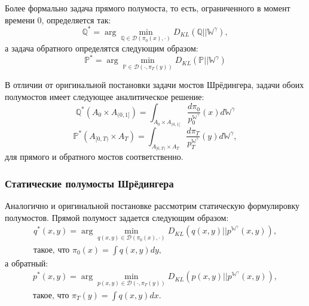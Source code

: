Более формально задача прямого полумоста, то есть, ограниченного в момент времени 0, определяется так:
\begin{equation}
    \mathbb{Q}^*=\arg\min_{\mathbb{Q}\in\mathcal{D}(\pi_0(x), \cdot)}D_{KL}\left(\mathbb{Q}||\mathbb{W}^\gamma\right),
    \label{eq:forward_hsb}
\end{equation}
а задача обратного определятся следующим образом:
\begin{equation}
    \mathbb{P}^*=\arg\min_{\mathbb{P}\in\mathcal{D}(\cdot, \pi_T(y))}D_{KL}\left(\mathbb{P}||\mathbb{W}^\gamma\right)
    \label{eq:backward_hsb}
\end{equation}

В отличии от оригинальной постановки задачи мостов Шрёдингера, задачи обоих полумостов имеет следующее аналитическое решение:
\begin{equation*}
    \mathbb{Q}^*(A_0\times A_{(0,1]})=\int_{A_0\times A_{(0,1]}}\frac{d\pi_0}{p_0^{\mathbb{W}^\gamma}}(x)d\mathbb{W}^\gamma
\end{equation*}
\begin{equation*}
    \mathbb{P}^*(A_{[0,T)} \times A_T)=\int_{A_{[0,T)} \times A_T}\frac{d\pi_T}{p_T^{\mathbb{W}^\gamma}}(y)d\mathbb{W}^\gamma,
\end{equation*}
для прямого и обратного мостов соответственно.

\subsubsection{Статические полумосты Шрёдингера}
Аналогично и оригинальной постановке рассмотрим статическую формулировку полумостов. Прямой полумост задается следующим образом:
\begin{equation}
    \begin{split}
        q^*(x,y)=\arg\min_{q(x,y)\in\mathcal{D}(\pi_0(x), \cdot)}D_{KL}\left(q(x,y)||p^{\mathbb{W}^\gamma}(x,y)\right), \\
        \text{такое, что } \pi_0(x) = \int q(x, y)dy,
    \end{split}
\end{equation}
а обратный:
\begin{equation}
\begin{split}
    p^*(x,y)=\arg\min_{p(x,y)\in\mathcal{D}(\cdot, \pi_T(y))}D_{KL}\left(p(x,y)||p^{\mathbb{W}^\gamma}(x,y)\right), \\
    \text{такое, что } \pi_T(y) = \int q(x, y)dx.
\end{split}
\end{equation}

